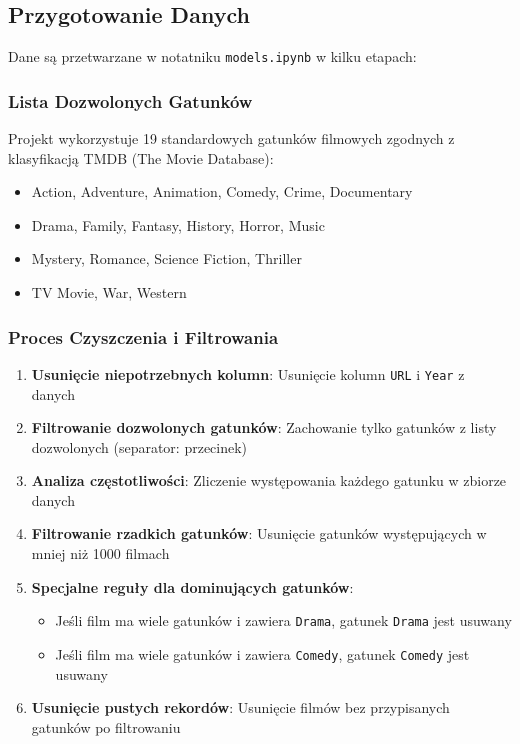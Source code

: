 \documentclass[12pt,a4paper]{article}
\begin{document}
\subsection{Przygotowanie Danych}

Dane są przetwarzane w notatniku \texttt{models.ipynb} w kilku etapach:

\subsubsection{Lista Dozwolonych Gatunków}

Projekt wykorzystuje 19 standardowych gatunków filmowych zgodnych z klasyfikacją TMDB (The Movie Database):

\begin{itemize}
    \item Action, Adventure, Animation, Comedy, Crime, Documentary
    \item Drama, Family, Fantasy, History, Horror, Music
    \item Mystery, Romance, Science Fiction, Thriller
    \item TV Movie, War, Western
\end{itemize}

\subsubsection{Proces Czyszczenia i Filtrowania}

\begin{enumerate}
    \item \textbf{Usunięcie niepotrzebnych kolumn}: Usunięcie kolumn \texttt{URL} i \texttt{Year} z danych
    \item \textbf{Filtrowanie dozwolonych gatunków}: Zachowanie tylko gatunków z listy dozwolonych (separator: przecinek)
    \item \textbf{Analiza częstotliwości}: Zliczenie występowania każdego gatunku w zbiorze danych
    \item \textbf{Filtrowanie rzadkich gatunków}: Usunięcie gatunków występujących w mniej niż 1000 filmach
    \item \textbf{Specjalne reguły dla dominujących gatunków}:
    \begin{itemize}
        \item Jeśli film ma wiele gatunków i zawiera \texttt{Drama}, gatunek \texttt{Drama} jest usuwany
        \item Jeśli film ma wiele gatunków i zawiera \texttt{Comedy}, gatunek \texttt{Comedy} jest usuwany
    \end{itemize}
    \item \textbf{Usunięcie pustych rekordów}: Usunięcie filmów bez przypisanych gatunków po filtrowaniu
\end{enumerate}
\end{document}
